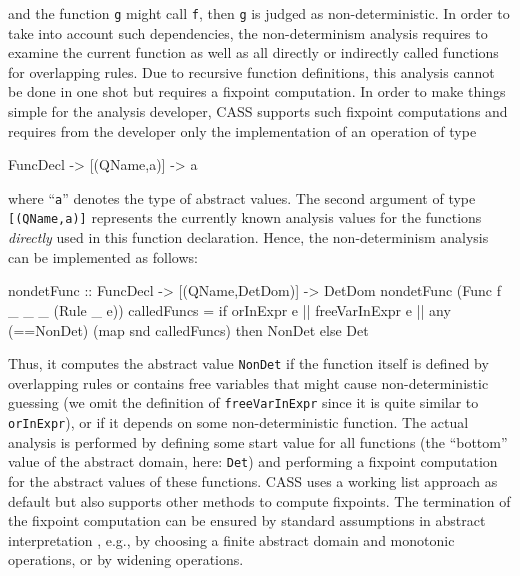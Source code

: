 \documentclass{llncs}
\newcommand{\code}[1]{\mbox{\small\texttt{#1}}}
\newcommand{\ccode}[1]{``\code{#1}''}
\begin{document}
and the function \code{g} might call \code{f}, then \code{g}
is judged as non-deterministic.
In order to take into account such dependencies,
the non-determinism analysis requires to examine the current
function as well as all directly or indirectly called functions
for overlapping rules.
Due to recursive function definitions, this analysis cannot be done
in one shot but requires a fixpoint computation.
In order to make things simple for the analysis developer,
CASS supports such fixpoint computations and requires from the
developer only the implementation of an operation of type
\begin{curry}
FuncDecl -> [(QName,a)] -> a
\end{curry}
where \ccode{a} denotes the type of abstract values.
The second argument of type \code{[(QName,a)]}
represents the currently known analysis values
for the functions \emph{directly} used in this function declaration.
Hence, the non-determinism analysis can be implemented
as follows:
\begin{curry}
nondetFunc :: FuncDecl -> [(QName,DetDom)] -> DetDom
nondetFunc (Func f _ _ _ (Rule _ e)) calledFuncs =
  if orInExpr e || freeVarInExpr e ||
     any (==NonDet) (map snd calledFuncs)
  then NonDet
  else Det
\end{curry}
Thus, it computes the abstract value \code{NonDet}
if the function itself is defined by overlapping rules or
contains free variables that might cause non-deterministic guessing
(we omit the definition of \code{freeVarInExpr} since it is quite
similar to \code{orInExpr}), or
if it depends on some non-deterministic function.
The actual analysis is performed by defining some start value
for all functions (the ``bottom'' value of the abstract domain,
here: \code{Det}) and performing a fixpoint computation for
the abstract values of these functions.
CASS uses a working list approach as default
but also supports other methods to compute fixpoints.
The termination of the fixpoint computation can be ensured
by standard assumptions in abstract interpretation
\cite{CousotCousot77}, e.g., by choosing a finite abstract domain
and monotonic operations, or by widening operations.
\end{document}

